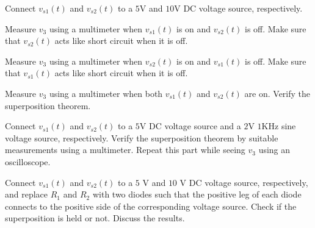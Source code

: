 \documentclass[11pt]{article}
\begin{document}
\begin{question}
    \begin{subquestion}{Connect $v_{s1}(t)$ and $v_{s2}(t)$ to a $5$V and $10$V DC voltage source, respectively.}
        \answer{}
    \end{subquestion}

    \begin{subquestion}{Measure $v_3$ using a multimeter when $v_{s1}(t)$ is on and $v_{s2}(t)$ is off. Make sure that $v_{s2}(t)$ acts like short circuit when it is off.}
        \answer{}
    \end{subquestion}

    \begin{subquestion}{Measure $v_3$ using a multimeter when $v_{s2}(t)$ is on and $v_{s1}(t)$ is off. Make sure that $v_{s1}(t)$ acts like short circuit when it is off.}
        \answer{}
    \end{subquestion}

    \begin{subquestion}{Measure $v_3$ using a multimeter when both $v_{s1}(t)$ and $v_{s2}(t)$ are on. Verify the superposition theorem.}
        \answer{}
    \end{subquestion}

    \begin{subquestion}{Connect $v_{s1}(t)$ and $v_{s2}(t)$ to a $5$V DC voltage source and a $2$V $1$KHz sine voltage source, respectively. Verify the superposition theorem by suitable measurements using a multimeter. Repeat this part while seeing $v_3$ using an oscilloscope.}
        \answer{}
    \end{subquestion}

    \begin{subquestion}{Connect $v_{s1}(t)$ and $v_{s2}(t)$ to a $5$ V and $10$ V DC voltage source, respectively, and replace $R_1$ and $R_2$ with two diodes such that the positive leg of each diode connects to the positive side of the corresponding voltage source. Check if the superposition is held or not. Discuss the results.}
        \answer{}
    \end{subquestion}

\end{question}

\end{document}
